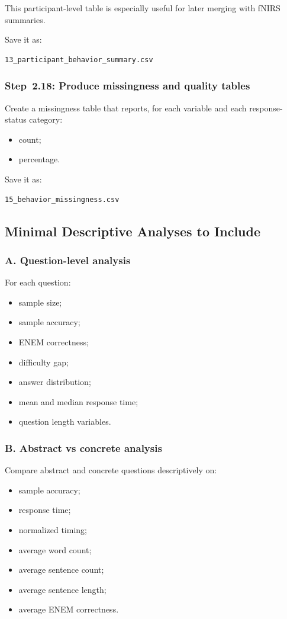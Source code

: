 This participant-level table is especially useful for later merging with fNIRS summaries.

Save it as:
\begin{verbatim}
13_participant_behavior_summary.csv
\end{verbatim}

\subsubsection{Step~2.18: Produce missingness and quality tables}
Create a missingness table that reports, for each variable and each response-status category:
\begin{itemize}
    \item count;
    \item percentage.
\end{itemize}

Save it as:
\begin{verbatim}
15_behavior_missingness.csv
\end{verbatim}

\subsection{Minimal Descriptive Analyses to Include}

\subsubsection*{A. Question-level analysis}
For each question:
\begin{itemize}
    \item sample size;
    \item sample accuracy;
    \item ENEM correctness;
    \item difficulty gap;
    \item answer distribution;
    \item mean and median response time;
    \item question length variables.
\end{itemize}

\subsubsection*{B. Abstract vs concrete analysis}
Compare abstract and concrete questions descriptively on:
\begin{itemize}
    \item sample accuracy;
    \item response time;
    \item normalized timing;
    \item average word count;
    \item average sentence count;
    \item average sentence length;
    \item average ENEM correctness.
\end{itemize}

